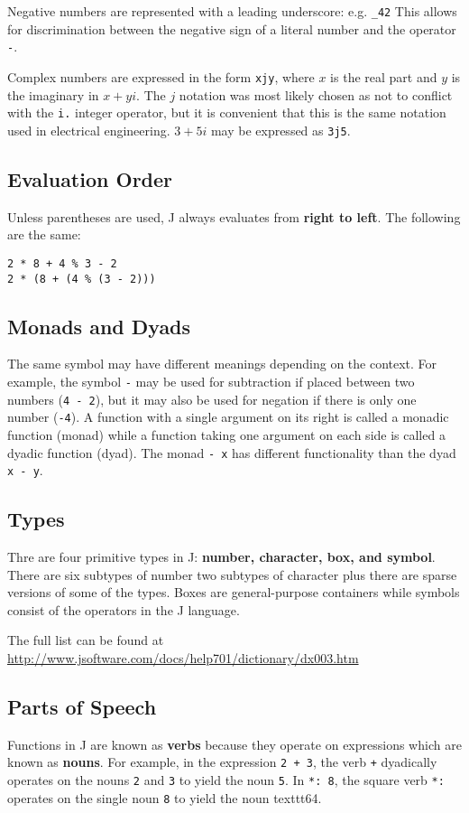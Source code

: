\documentclass[12pt]{article}
\begin{document}
\bigskip

Negative numbers are represented with a leading underscore: e.g. \texttt{\_42}
This allows for discrimination between the negative sign of a literal number
and the operator \texttt{-}.

\bigskip

Complex numbers are expressed in the form \texttt{xjy}, where $x$ is the real
part and $y$ is the imaginary in $x + yi$. The $j$ notation was most likely
chosen as not to conflict with the \texttt{i.} integer operator, but it is
convenient that this is the same notation used in electrical engineering.
$3 + 5i$ may be expressed as \texttt{3j5}.

\subsection{Evaluation Order}
Unless parentheses are used, J always evaluates from \textbf{right to left}.
The following are the same:
\begin{verbatim}
2 * 8 + 4 % 3 - 2
2 * (8 + (4 % (3 - 2)))
\end{verbatim}

\subsection{Monads and Dyads}
The same symbol may have different meanings depending on the context. For
example, the symbol \texttt{-} may be used for subtraction if placed between
two numbers (\texttt{4 - 2}), but it may also be used for negation if there
is only one number (\texttt{-4}). A function with a single argument on its
right is called a monadic function (monad) while a function taking one argument
on each side is called a dyadic function (dyad). The monad \texttt{- x} has
different functionality than the dyad \texttt{x - y}.

\subsection{Types}
Thre are four primitive types in J: \textbf{number, character, box, and symbol}.
There are six subtypes of number two subtypes of character plus there are
sparse versions of some of the types. Boxes are general-purpose containers
while symbols consist of the operators in the J language.

The full list can be found at
\url{http://www.jsoftware.com/docs/help701/dictionary/dx003.htm}

\subsection{Parts of Speech}
Functions in J are known as \textbf{verbs} because they operate on expressions
which are known as \textbf{nouns}. For example, in the expression
\texttt{2 + 3}, the verb \texttt{+} dyadically operates on the nouns \texttt{2}
and \texttt{3} to yield the noun \texttt{5}. In \texttt{*: 8}, the square verb
\texttt{*:} operates on the single noun \texttt{8} to yield the noun 
texttt{64}.
\end{document}
